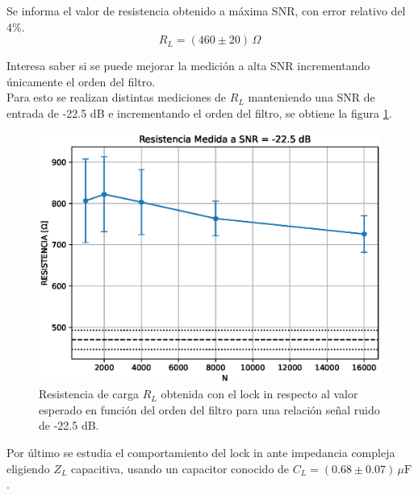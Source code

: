 \documentclass[11pt,a4paper]{extarticle}
\begin{document}
\begin{multicols}{2}
Se informa el valor de resistencia obtenido a máxima SNR, con error relativo del 4\%.
\begin{equation*}
	R_L = \left(460 \pm 20\right) \, \Omega
\end{equation*}

Interesa saber si se puede mejorar la medición a alta SNR incrementando únicamente el orden del filtro.\\


Para esto se realizan distintas mediciones de $R_L$
manteniendo una SNR de entrada de -22.5 dB e incrementando el orden del filtro, se obtiene la figura \ref{fig:RORDEN}.\\


\begin{figure}[H]
	\centering
	\includegraphics[width=\linewidth]{Images/R_orden.eps}
	\caption{Resistencia de carga $R_L$ obtenida con 
	el lock in respecto al valor esperado en función
	del orden del filtro para  
	una relación señal ruido de -22.5 dB.}
	\label{fig:RORDEN}
\end{figure}

Por último se estudia el comportamiento del lock in ante impedancia compleja eligiendo $Z_L$ capacitiva, usando un capacitor conocido de $C_L = (0.68 \pm 0.07) \, \mu \mathrm F$.\\


\end{multicols}
\end{document}
